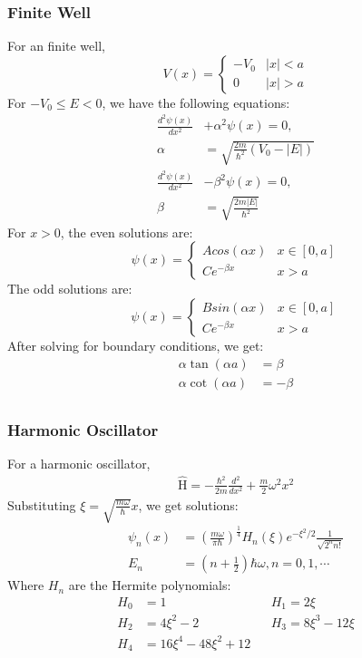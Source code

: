 \documentclass[11pt, letterpaper]{article}
\newcommand{\operator}[1]{
  \ensuremath{\hat{\text{#1}}}}        %
\begin{document}
\begin{multicols*}{3}
\subsubsection{Finite Well}
For an finite well,
\[
V(x) =
\begin{cases}
  -V_0 & |x| < a \\
  0 & |x| > a
\end{cases}
\]
For $-V_0 \leq E < 0$, we have the following equations:
\begin{align*}
  \frac{d^2 \psi(x)}{dx^2} &+ \alpha^2 \psi(x) = 0, \\
  \alpha &= \sqrt{\frac{2m}{\hbar^2}(V_0 - |E|)} \\
  \frac{d^2 \psi(x)}{dx^2} &- \beta^2 \psi(x) = 0, \\
  \beta &= \sqrt{\frac{2m|E|}{\hbar^2}}
\end{align*}
For $x>0$, the even solutions are:
\[
  \psi(x)=
  \begin{cases}
    A cos(\alpha x) &x \in [0, a] \\
    C e^{-\beta x}  &x > a
  \end{cases}
\]
The odd solutions are:
\[
\psi(x)=
\begin{cases}
  B sin(\alpha x) &x \in [0, a] \\
  C e^{-\beta x}  &x > a
\end{cases}
\]
After solving for boundary conditions, we get:
\begin{align*}
  \alpha \tan(\alpha a) &= \beta \\
  \alpha \cot(\alpha a) &= -\beta \\
\end{align*}

\subsubsection{Harmonic Oscillator}
For a harmonic oscillator,
\begin{align*}
  \operator{H} = -\frac{\hbar^2}{2m} \frac{d^2}{dx^2} + \frac{m}{2}\omega^2 x^2
\end{align*}
Substituting $\xi = \sqrt{\frac{m\omega}{\hbar}}x$, we get solutions:
\begin{align*}
  \psi_n(x) &= \left( \frac{m\omega}{\pi \hbar} \right)^\frac{1}{4} H_n(\xi)
  e^{-\xi^2/2} \frac{1}{\sqrt{2^n n!}} \\
  E_n &= \left(n + \frac{1}{2}\right) \hbar \omega , n = 0,1,\cdots
\end{align*}
Where $H_n$ are the Hermite polynomials:
\begin{alignat*}{3}
  H_0 &= 1 && H_1 = 2\xi \\
  H_2 &= 4\xi^2 - 2 && H_3 = 8\xi^3 - 12\xi \\
  H_4 &= 16\xi^4 - 48\xi^2 + 12 &&
\end{alignat*}


\end{multicols*}
\end{document}
